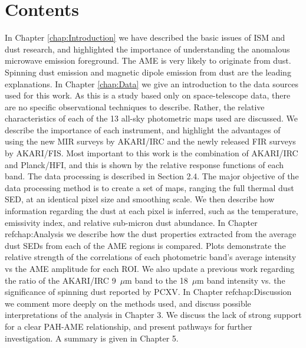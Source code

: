 \section{Contents}  
  In Chapter \ref{chap:Introduction} we have described the basic issues of ISM and dust research, and highlighted the importance of understanding the anomalous microwave emission foreground. The AME is very likely to originate from dust. Spinning dust emission and magnetic dipole emission from dust are the leading explanations.  
  In Chapter \ref{chap:Data} we give an introduction to the data sources used for this work. As this is a study based only on space-telescope data, there are no specific observational techniques to describe. Rather, the relative characteristics of each of the 13 all-sky photometric maps used are discussed. We describe the importance of each instrument, and highlight the advantages of using the new MIR surveys by AKARI/IRC and the newly released  FIR surveys by AKARI/FIS. Most important to this work is the combination of AKARI/IRC and Planck/HFI, and this is shown by the relative response functions of each band.
  The data processing is described in Section 2.4. The major objective of the data processing method is to create a set of maps, ranging the full thermal dust SED, at an identical pixel size and smoothing scale.  We then describe how information regarding the dust at each pixel is inferred, such as the temperature, emissivity index, and relative sub-micron dust abundance. 
  In Chapter ref{chap:Analysis} we describe how the dust properties extracted from the average dust SEDs from each of the AME regions is compared. Plots demonstrate the relative strength of the correlations of each photometric band's average intensity vs the AME amplitude for each ROI. We also update a previous work regarding the ratio of the AKARI/IRC 9~$\mu$m band to the 18~$\mu$m band intensity vs. the significance of spinning dust reported by PCXV.
  In Chapter ref{chap:Discussion} we comment more deeply on the methods used, and discuss possible interpretations of the analysis in Chapter 3. We discuss the lack of strong support for a clear PAH-AME relationship, and present pathways for further investigation.
  A summary is given in Chapter 5.
